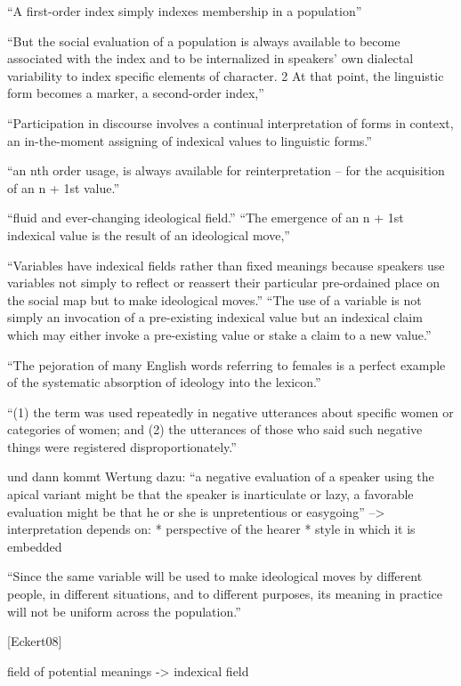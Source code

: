 ``A first-order index simply indexes membership in a population''

``But the social evaluation of a population
is always available to become associated with the index and to be internalized
in speakers’ own dialectal variability to index specific elements of character. 2 At
that point, the linguistic form becomes a marker, a second-order index,''

``Participation in discourse involves a continual
interpretation of forms in context, an in-the-moment assigning of indexical
values to linguistic forms.''

``an nth order usage, is always available for reinterpretation – for the
acquisition of an n + 1st value.''

``fluid and ever-changing ideological field.''
``The emergence of an n + 1st indexical value is the result of an ideological move,''

``Variables have indexical fields rather than fixed meanings because speakers use
variables not simply to reflect or reassert their particular pre-ordained place
on the social map but to make ideological moves.''
``The use of a variable is not
simply an invocation of a pre-existing indexical value but an indexical claim
which may either invoke a pre-existing value or stake a claim to a new value.''

``The
pejoration of many English words referring to females is a perfect example of the
systematic absorption of ideology into the lexicon.''

``(1) the term was used
repeatedly in negative utterances about specific women or categories of women;
and (2) the utterances of those who said such negative things were registered
disproportionately.''

und dann kommt Wertung dazu:
``a negative evaluation of a speaker using
the apical variant might be that the speaker is inarticulate or lazy, a favorable
evaluation might be that he or she is unpretentious or easygoing''
--> interpretation depends on:
* perspective of the hearer
* style in which it is embedded

``Since the same variable will be used to make ideological moves by different
people, in different situations, and to different purposes, its meaning in practice
will not be uniform across the population.''

[Eckert08]

field of potential meanings -> indexical field

